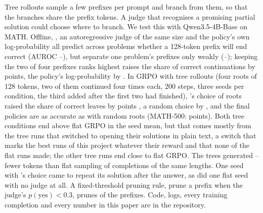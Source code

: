 Tree rollouts sample a few prefixes per prompt and branch from them, so that the branches share the prefix tokens. A
judge that recognises a promising partial solution could choose where to branch. We test this with Qwen3.5-4B-Base on
MATH. Offline, \kev{}, an autoregressive judge of the same size and the policy's own log-probability all predict
across problems whether a 128-token prefix will end correct (AUROC --), but
separate one problem's prefixes only weakly (--); keeping the two of
four prefixes \kev{} ranks highest raises the share of correct continuations by  points,
the policy's log-probability by . In GRPO with tree rollouts (four roots of 128 tokens, two of
them continued four times each, 200 steps, three seeds per condition, the third added after the first two had
finished), \kev{}'s choice of roots raised the share of correct leaves by  points
, a random choice by ,
and the final policies are as accurate as with random roots (MATH-500: 
 points). Both tree conditions end above flat GRPO
in the seed mean, but that comes mostly from the  tree runs that switched to opening their solutions in
plain text, a switch that marks the best runs of this project whatever their reward and that none of the
 flat runs made; the other tree runs end close to flat GRPO. The trees generated
-- fewer tokens than flat sampling of completions of the same lengths. One
seed with \kev{}'s choice came to repeat its solution after the answer, as did one flat seed with no judge at all. A
fixed-threshold pruning rule, prune a prefix when the judge's $p(\text{yes})<0.3$, prunes
 of the prefixes. Code, logs, every training completion and every number in this paper are in the repository.
